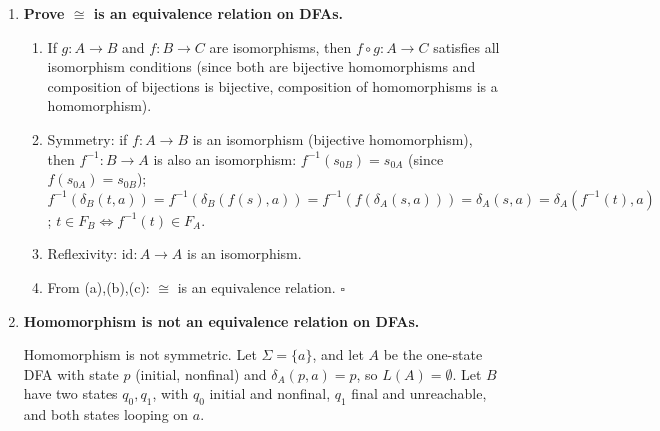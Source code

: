 \begin{enumerate}[{3.}1.]
\begin{enumerate}
\item $A$ not reduced, $A^c$ is reduced: take
\[
A=\langle\{\pmb{a}\},\{q_0,q_1,q_2\},q_0,\delta,\{q_1,q_2\}\rangle,
\]
where
\[
\delta(q_0,\pmb{a})=q_1,\qquad \delta(q_1,\pmb{a})=q_1,\qquad
\delta(q_2,\pmb{a})=q_2.
\]
The state $q_2$ is unreachable, and $q_1 E_A q_2$ because from either state
every continuation is accepted. So $A$ is not reduced. However,
\[
A^c=\langle\{\pmb{a}\},\{q_0,q_1\},q_0,\delta|_{S^c\times\Sigma},\{q_1\}\rangle,
\]
and $q_0$ and $q_1$ are not equivalent in $A^c$ because $\lambda$ is rejected
from $q_0$ but accepted from $q_1$. Hence $A^c$ is reduced.
\end{enumerate}

\item \textbf{Prove $\cong$ is an equivalence relation on DFAs.}

\begin{enumerate}
\item If $g: A\to B$ and $f: B\to C$ are isomorphisms, then $f\circ g: A\to C$ satisfies all isomorphism conditions (since both are bijective homomorphisms and composition of bijections is bijective, composition of homomorphisms is a homomorphism).

\item Symmetry: if $f: A\to B$ is an isomorphism (bijective homomorphism), then $f^{-1}: B\to A$ is also an isomorphism: $f^{-1}(s_{0B})=s_{0A}$ (since $f(s_{0A})=s_{0B}$); $f^{-1}(\delta_B(t,a))=f^{-1}(\delta_B(f(s),a))=f^{-1}(f(\delta_A(s,a)))=\delta_A(s,a)=\delta_A(f^{-1}(t),a)$; $t\in F_B\Leftrightarrow f^{-1}(t)\in F_A$.

\item Reflexivity: $\mathrm{id}: A\to A$ is an isomorphism.

\item From (a),(b),(c): $\cong$ is an equivalence relation. $\square$
\end{enumerate}

\item \textbf{Homomorphism is not an equivalence relation on DFAs.}

Homomorphism is not symmetric. Let $\Sigma=\{a\}$, and let $A$ be the
one-state DFA with state $p$ (initial, nonfinal) and $\delta_A(p,a)=p$, so
$L(A)=\emptyset$. Let $B$ have two states $q_0,q_1$, with $q_0$ initial and
nonfinal, $q_1$ final and unreachable, and both states looping on $a$.


\end{enumerate}
